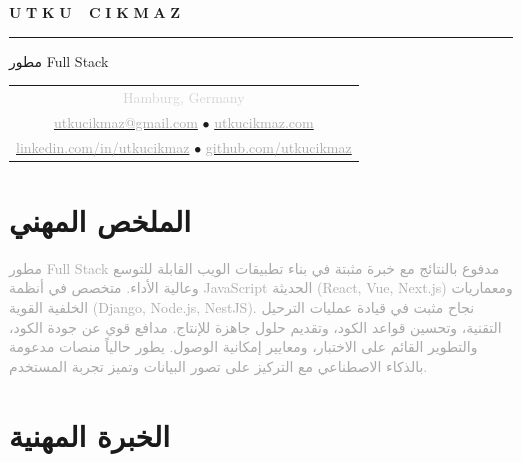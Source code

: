 \documentclass[10pt,a4paper]{article}
\newcommand{\gradientname}[1]{%
  \textcolor{darkgray!90}{\Huge\bfseries U}%
  \textcolor{darkgray!80}{\Huge\bfseries T}%
  \textcolor{darkgray!70}{\Huge\bfseries K}%
  \textcolor{darkgray!60}{\Huge\bfseries U}%
  \textcolor{mediumgray!90}{\Huge\bfseries\ }%
  \textcolor{mediumgray!80}{\Huge\bfseries C}%
  \textcolor{mediumgray!70}{\Huge\bfseries I}%
  \textcolor{mediumgray!60}{\Huge\bfseries K}%
  \textcolor{mediumgray!50}{\Huge\bfseries M}%
  \textcolor{lightgray!80}{\Huge\bfseries A}%
  \textcolor{lightgray!70}{\Huge\bfseries Z}%
}
\begin{document}
\color{black}
\pagestyle{empty}

\begin{center}
  \vspace{-3pt}
  \gradientname{UTKU CIKMAZ}
  
  \vspace{4pt}
  \textcolor{verylightgray}{\rule{0.35\textwidth}{0.6pt}}
  
  \vspace{4pt}
  {\large\color{mediumgray}مطور Full Stack}
  
  \vspace{5pt}
  \begin{tabular}{c}
    \textcolor{lightgray}{\small Hamburg, Germany} \\[2pt]
    \href{mailto:utkucikmaz@gmail.com}{\textcolor{darkgray}{utkucikmaz@gmail.com}} \quad
    \textcolor{verylightgray}{$\bullet$} \quad
    \href{https://www.utkucikmaz.com}{\textcolor{darkgray}{utkucikmaz.com}} \\[1pt]
    \href{https://linkedin.com/in/utkucikmaz}{\textcolor{darkgray}{linkedin.com/in/utkucikmaz}} \quad
    \textcolor{verylightgray}{$\bullet$} \quad
    \href{https://github.com/utkucikmaz}{\textcolor{darkgray}{github.com/utkucikmaz}}
  \end{tabular}
\end{center}

\vspace{1pt}

\section*{الملخص المهني}
\vspace{0pt}
\textcolor{darkgray}{%
مطور Full Stack مدفوع بالنتائج مع خبرة مثبتة في بناء تطبيقات الويب القابلة للتوسع وعالية الأداء. متخصص في أنظمة JavaScript الحديثة (React, Vue, Next.js) ومعماريات الخلفية القوية (Django, Node.js, NestJS). نجاح مثبت في قيادة عمليات الترحيل التقنية، وتحسين قواعد الكود، وتقديم حلول جاهزة للإنتاج. مدافع قوي عن جودة الكود، والتطوير القائم على الاختبار، ومعايير إمكانية الوصول. يطور حالياً منصات مدعومة بالذكاء الاصطناعي مع التركيز على تصور البيانات وتميز تجربة المستخدم.
}
\vspace{1pt}

\section*{الخبرة المهنية}
\end{document}
